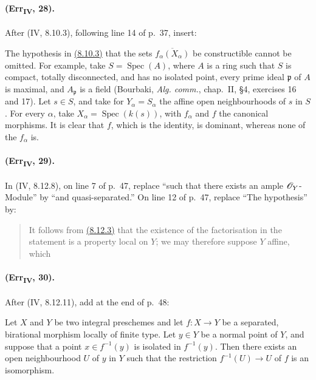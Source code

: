 \paragraph{(Err\textsubscript{IV}, 28).}
After (IV, 8.10.3), following line 14 of p.~37, insert:

\begin{remark}[8.10.3.1]
\label{IV.8.10.3.1}
The hypothesis in {\hyperref[IV.8.10.3]{(8.10.3)}} that the sets
$\overline{f_\alpha(X_\alpha)}$ be constructible cannot be omitted.
For example, take $S=\operatorname{Spec}(A)$, where $A$ is a ring such
that $S$ is compact, totally disconnected, and has no isolated point,
every prime ideal $\mathfrak p$ of $A$ is maximal, and $A_\mathfrak p$
is a field (Bourbaki, \emph{Alg. comm.}, chap.~II, \S4,
exercises 16 and 17).  Let $s\in S$, and take for
$Y_\alpha=S_\alpha$ the affine open neighbourhoods of $s$ in $S$.
For every $\alpha$, take $X_\alpha=\operatorname{Spec}(k(s))$, with
$f_\alpha$ and $f$ the canonical morphisms.  It is clear that $f$,
which is the identity, is dominant, whereas none of the $f_\alpha$ is.
\end{remark}

\paragraph{(Err\textsubscript{IV}, 29).}
In (IV, 8.12.8), on line 7 of p.~47, replace ``such that there exists an
ample $\mathscr{O}_Y$-Module'' by ``and quasi-separated.''  On line 12 of
p.~47, replace ``The hypothesis'' by:
\begin{quote}
It follows from {\hyperref[IV.8.12.3]{(8.12.3)}} that the existence of the factorisation in the
statement is a property local on $Y$; we may therefore suppose $Y$
affine, which
\end{quote}

\paragraph{(Err\textsubscript{IV}, 30).}
After (IV, 8.12.11), add at the end of p.~48:

\begin{corollary}[8.12.12]
\label{IV.8.12.12}
Let $X$ and $Y$ be two integral preschemes and let $f:X\to Y$ be a
separated, birational morphism locally of finite type.  Let $y\in Y$ be
a normal point of $Y$, and suppose that a point $x\in f^{-1}(y)$ is
isolated in $f^{-1}(y)$.  Then there exists an open neighbourhood $U$
of $y$ in $Y$ such that the restriction $f^{-1}(U)\to U$ of $f$ is an
isomorphism.
\end{corollary}

